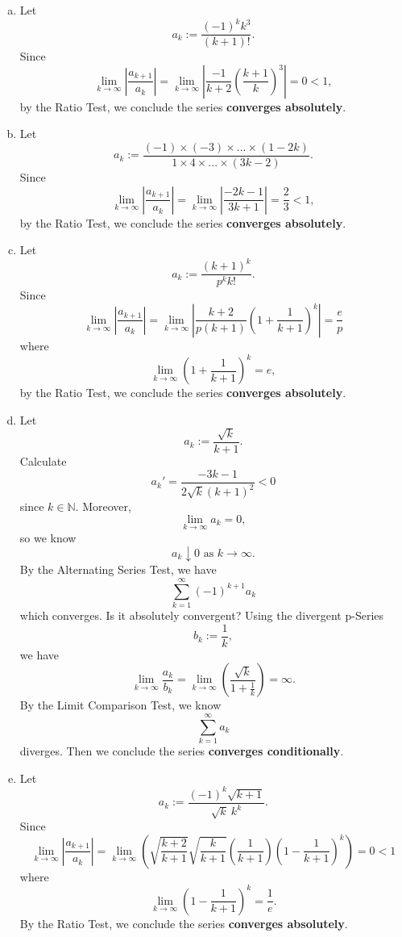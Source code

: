 \begin{Exercise}
\begin{enumerate}[a)]
\item
\begin{solution}
Let $$a_k := \frac{(-1)^kk^3}{(k+1)!}.$$
Since $$\lim_{k\to\infty}\left|\frac{a_{k+1}}{a_k}\right| = \lim_{k\to\infty}\left|\frac{-1}{k+2}\left(\frac{k+1}{k}\right)^3\right| = 0 < 1,$$ by the Ratio Test, we conclude the series \textbf{converges absolutely}.
\end{solution}

\item
\begin{solution}
Let $$a_k := \frac{(-1)\times(-3)\times...\times(1-2k)}{1 \times 4 \times ... \times (3k-2)}.$$
Since $$\lim_{k\to\infty}\left|\frac{a_{k+1}}{a_k}\right| = \lim_{k\to\infty}\left|\frac{-2k-1}{3k+1}\right| = \frac{2}{3} < 1,$$ by the Ratio Test, we conclude the series \textbf{converges absolutely}.
\end{solution}

\item
\begin{solution}
Let $$a_k := \frac{\left( k+1 \right)^k}{p^k k!}.$$
Since $$\lim_{k\to\infty}\left|\frac{a_{k+1}}{a_k}\right| = \lim_{k\to\infty}\left|\frac{k+2}{p\left(k+1\right)}\left(1+\frac{1}{k+1}\right)^k\right| = \frac{e}{p}$$ where $$\lim_{k\to\infty}\left(1+\frac{1}{k+1}\right)^k = e,$$
by the Ratio Test, we conclude the series \textbf{converges absolutely}.
\end{solution}

\item
\begin{solution}
Let $$a_k := \frac{\sqrt{k}}{k+1}.$$
Calculate $$a_k' = \frac{-3k-1}{2\sqrt{k}\left(k+1\right)^2} < 0$$ since $k\in\mathbb{N}$. Moreover, $$\lim_{k\to\infty}a_k = 0,$$ so we know $$a_k\downarrow 0\text{ as }k\to\infty.$$ By the Alternating Series Test, we have $$\sum_{k=1}^{\infty}\left(-1\right)^{k+1}a_k$$ which converges.
Is it absolutely convergent? Using the divergent p-Series $$b_k := \frac{1}{k},$$ we have $$\lim_{k\to\infty}\frac{a_k}{b_k} = \lim_{k\to\infty}\left(\frac{\sqrt{k}}{1+\frac{1}{k}}\right) = \infty.$$ By the Limit Comparison Test, we know $$\sum_{k=1}^{\infty}a_k$$ diverges. Then we conclude the series \textbf{converges conditionally}.
\end{solution}

\item
\begin{solution}
Let $$a_k := \frac{(-1)^k\sqrt{k+1}}{\sqrt{k}\ k^k}.$$
Since $$\lim_{k\to\infty}\left|\frac{a_{k+1}}{a_k}\right| =
\lim_{k\to\infty}\left(\sqrt{\frac{k+2}{k+1}}\sqrt{\frac{k}{k+1}}\left(\frac{1}{k+1}\right)\left(1-\frac{1}{k+1}\right)^k\right) = 0 < 1$$
where $$\lim_{k\to\infty}\left(1-\frac{1}{k+1}\right)^k = \frac{1}{e}.$$
By the Ratio Test, we conclude the series \textbf{converges absolutely}.
\end{solution}
\end{enumerate}
\end{Exercise}